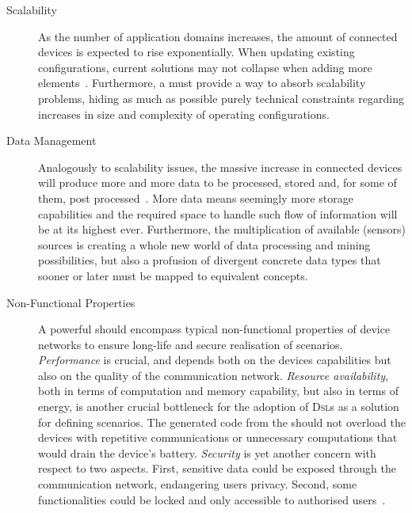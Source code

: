 \begin{description}
	\item[Scalability] As the number of application domains increases, the amount of connected devices is expected to rise exponentially. When updating existing \IOT configurations, current solutions may not collapse when adding more elements~\cite{mukho-14}. Furthermore, a \DSL must provide a way to absorb scalability problems, hiding as much as possible purely technical constraints regarding increases in size and complexity of operating configurations. 
	
	\item[Data Management] Analogously to scalability issues, the massive increase in connected devices will produce more and more data to be processed, stored and, for some of them, post processed~\cite{lee-15}. More data means seemingly more storage capabilities and the required space to handle such flow of information will be at its highest ever. Furthermore, the multiplication of available (sensors) sources is creating a whole new world of data processing and mining possibilities, but also a profusion of divergent concrete data types that sooner or later must be mapped to equivalent concepts.
	
	\item[Non-Functional Properties] A powerful \DSL should encompass typical non-functional properties of device networks to ensure long-life and secure realisation of scenarios. \emph{Performance} is crucial, and depends both on the devices capabilities but also on the quality of the communication network. \emph{Resource availability}, both in terms of computation and memory capability, but also in terms of energy, is another crucial bottleneck for the adoption of \textsc{Dsl}s as a solution for defining scenarios. The generated code from the \DSL should not overload the devices with repetitive communications or unnecessary computations that would drain the device's battery. \emph{Security} is yet another concern with respect to two aspects. First, sensitive data could be exposed through the communication network, endangering users privacy. Second, some functionalities could be locked and only accessible to authorised users~\cite{tan-10}.
\end{description}